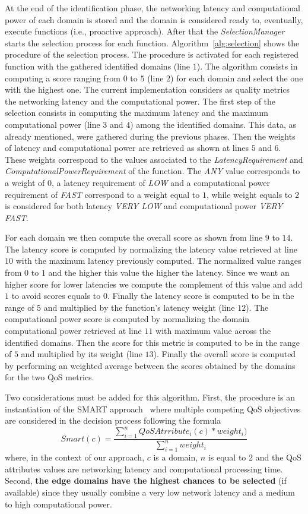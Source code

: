 At the end of the identification phase, the networking latency and computational power of each domain is stored and the domain is considered ready to, eventually, execute functions (i.e., proactive approach). After that the \textit{SelectionManager} starts the selection process for each function. 
Algorithm~\ref{alg:selection} shows the procedure of the selection process. The procedure is activated for each registered function with the gathered identified domains (line $1$). The algorithm consists in computing a score ranging from $0$ to $5$ (line $2$) for each domain and select the one with the highest one. The current implementation considers as quality metrics the networking latency and the computational power. The first step of the selection consists in computing the maximum latency and the maximum computational power (line $3$ and $4$) among the identified domains. This data, as already mentioned, were gathered during the previous phases. Then the weights of latency and computational power are retrieved as shown at lines $5$ and $6$. These weights correspond to the values associated to the \textit{LatencyRequirement} and \textit{ComputationalPowerRequirement} of the function. The \textit{ANY} value corresponds to a weight of $0$, a latency requirement of \textit{LOW} and a computational power requirement of \textit{FAST} correspond to a weight equal to $1$, while weight equals to $2$ is considered for both latency \textit{VERY LOW} and computational power \textit{VERY FAST}.

For each domain we then compute the overall score as shown from line  $9$ to $14$. The latency score is computed by normalizing the latency value retrieved at line $10$ with the maximum latency previously computed. The normalized value ranges from $0$ to $1$ and the higher this value the higher the latency. Since we want an higher score for lower latencies we compute the complement of this value and add $1$ to avoid scores equals to $0$. Finally the latency score is computed to be in the range of $5$ and multiplied by the function's latency weight (line $12$). The computational power score is computed by normalizing the domain computational power retrieved at line $11$ with maximum value across the identified domains. Then the score for this metric is computed to be in the range of $5$ and multiplied by its weight (line $13$). Finally the overall score is computed by performing an weighted average between the scores obtained by the domains for the two QoS metrics.

Two considerations must be added for this algorithm. First, the procedure is an instantiation of the SMART approach~\cite{Olson1996} where multiple competing QoS objectives are considered in the decision process following the formula
\begin{equation}
Smart(c) = \frac{\sum_{i=1}^{n} QoSAtrribute_i(c)*weight_i)}{\sum_{i=1}^{n}weight_i} 
\end{equation}
where, in the context of our approach, $c$ is a domain, $n$ is equal to $2$ and the QoS attributes values are networking latency and computational processing time.
Second, \textbf{the edge domains have the highest chances to be selected} (if available) since they usually combine a very low network latency and a medium to high computational power. 

